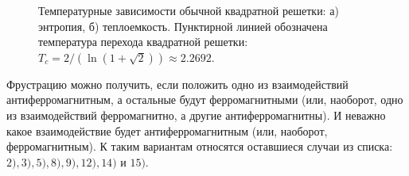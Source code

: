 \documentclass[utf8,12pt]{jetp}
\begin{document}
\begin{figure}[h]
	\begin{minipage}[h]{0.5\linewidth}
	\end{minipage}
	\hfill
	\begin{minipage}[h]{0.5\linewidth}
	\end{minipage}
	\caption{Температурные зависимости обычной квадратной решетки: а) энтропия, б) теплоемкость. Пунктирной линией обозначена температура перехода квадратной решетки: $T_c = 2/(\ln(1+\sqrt{2}))\approx 2.2692$.}
	\label{SimpleSquareLattice}
\end{figure}

Фрустрацию можно получить, если положить одно из взаимодействий антиферромагнитным, а остальные будут ферромагнитными (или, наоборот, одно из взаимодействий ферромагнитно, а другие антиферромагнитны). И неважно какое взаимодействие будет антиферромагнитным (или, наоборот, ферромагнитным). К таким вариантам относятся оставшиеся случаи из списка: $2), 3), 5), 8), 9), 12), 14)$ и $15)$.
\end{document}
